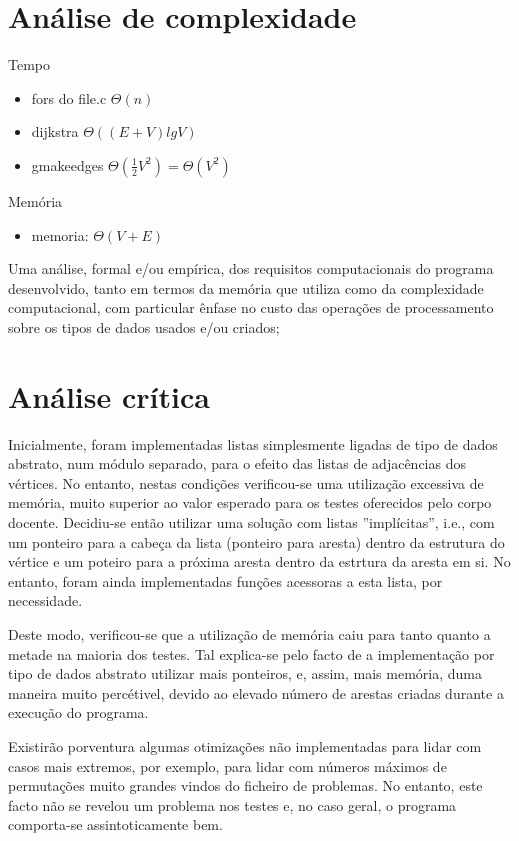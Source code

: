 \documentclass[a4paper, 18pt]{article}
\newcommand\tu[0]{\textunderscore}
\begin{document}
\section{Análise de complexidade}
	\par
	Tempo
	\begin{itemize}
		\item fors do file.c $\Theta(n)$
		\item dijkstra $\Theta((E+V) lg V)$
		\item g\tu make\tu edges $\Theta(\frac{1}{2}V^2) = \Theta(V^2)$
	\end{itemize}
	\par
	Memória
	\begin{itemize}
		\item memoria: $\Theta(V + E)$
	\end{itemize}
	\par
	Uma análise, formal e/ou empírica, dos requisitos computacionais do programa desenvolvido, tanto em termos da memória que utiliza como da complexidade computacional, com particular ênfase no custo das operações de processamento sobre os tipos de dados usados e/ou criados;


\section{Análise crítica}
\label{sec:analise}
	\par
	Inicialmente, foram implementadas listas simplesmente ligadas de tipo de dados abstrato, num módulo separado, para o efeito das listas de adjacências dos vértices. No entanto, nestas condições verificou-se uma utilização excessiva de memória, muito superior ao valor esperado para os testes oferecidos pelo corpo docente. Decidiu-se então utilizar uma solução com listas ''implícitas'', i.e., com um ponteiro para a cabeça da lista (ponteiro para aresta) dentro da estrutura do vértice e um poteiro para a próxima aresta dentro da estrtura da aresta em si. No entanto, foram ainda implementadas funções acessoras a esta lista, por necessidade.
	\par
	Deste modo, verificou-se que a utilização de memória caiu para tanto quanto a metade na maioria dos testes. Tal explica-se pelo facto de a implementação por tipo de dados abstrato utilizar mais ponteiros, e, assim, mais memória, duma maneira muito percétivel, devido ao elevado número de arestas criadas durante a execução do programa.
	\par\null\par
	Existirão porventura algumas otimizações não implementadas para lidar com casos mais extremos, por exemplo, para lidar com números máximos de permutações muito grandes vindos do ficheiro de problemas. No entanto, este facto não se revelou um problema nos testes e, no caso geral, o programa comporta-se assintoticamente bem.
\end{document}
